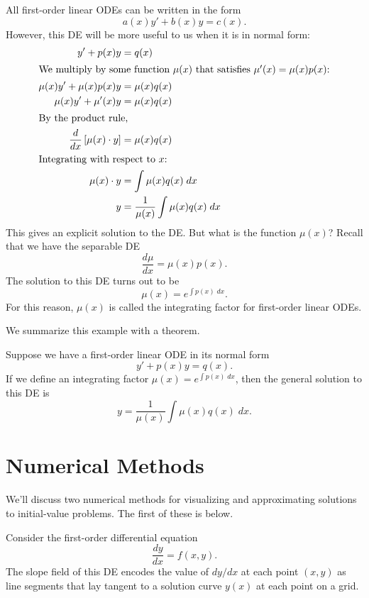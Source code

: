 \documentclass[../m082main.tex]{subfiles}
\begin{document}
\begin{example}
    All first-order linear ODEs can be written in the form
    \[ a(x)y' + b(x)y = c(x). \]
    However, this DE will be more useful to us when it is in normal form:
    \begin{align*}
        y' + p(x)y &= q(x) \\
        \intertext{We multiply by some function $\mu(x)$ that satisfies $\mu'(x) = \mu(x)p(x)$:}
        \mu(x)y' + \mu(x)p(x)y &= \mu(x)q(x) \\
        \mu(x)y' + \mu'(x)y &= \mu(x)q(x) \\
        \intertext{By the product rule,}
        \frac{d}{dx} \left[ \mu(x) \cdot y \right] &= \mu(x)q(x) \\
        \intertext{Integrating with respect to $x$:}
        \mu(x) \cdot y &= \int \mu(x)q(x) \;dx \\
        y &= \frac{1}{\mu(x)} \int \mu(x)q(x) \;dx
    \end{align*}
    This gives an explicit solution to the DE.
    But what is the function $\mu(x)$?
    Recall that we have the separable DE
    \[ \frac{d\mu}{dx} = \mu(x)p(x). \]
    The solution to this DE turns out to be
    \[ \mu(x) = e^{\int p(x) \;dx}. \]
    For this reason, $\mu(x)$ is called the integrating factor for first-order linear ODEs. 
\end{example}

We summarize this example with a theorem.

\begin{theorem}
    Suppose we have a first-order linear ODE in its normal form
    \[ y' + p(x)y = q(x). \]
    If we define an integrating factor $\mu(x) = e^{\int p(x) \;dx}$, then the general solution to this DE is
    \[ y = \frac{1}{\mu(x)} \int \mu(x)q(x) \;dx. \]
\end{theorem}

\section{Numerical Methods}
We'll discuss two numerical methods for visualizing and approximating solutions to initial-value problems.
The first of these is below.

\begin{definition}
Consider the first-order differential equation
\[ \frac{dy}{dx} = f(x, y). \]
The slope field of this DE encodes the value of $dy / dx$ at each point $(x, y)$ as line segments that lay tangent to a solution curve $y(x)$ at each point on a grid.
\end{definition}
\end{document}
